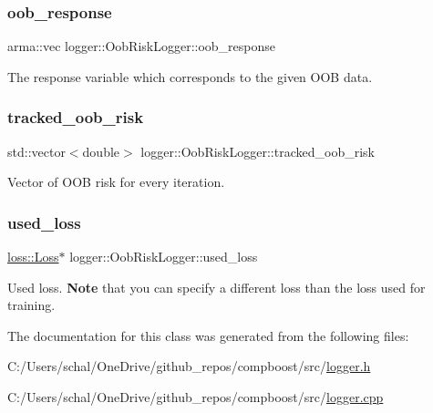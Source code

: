 \subsubsection{\texorpdfstring{oob\+\_\+response}{oob\_response}}
{\footnotesize\ttfamily arma\+::vec logger\+::\+Oob\+Risk\+Logger\+::oob\+\_\+response\hspace{0.3cm}{\ttfamily [private]}}



The response variable which corresponds to the given O\+OB data. 

\mbox{\label{classlogger_1_1_oob_risk_logger_a00a9435107588888c891c88aead67159}} 
\subsubsection{\texorpdfstring{tracked\+\_\+oob\+\_\+risk}{tracked\_oob\_risk}}
{\footnotesize\ttfamily std\+::vector$<$double$>$ logger\+::\+Oob\+Risk\+Logger\+::tracked\+\_\+oob\+\_\+risk\hspace{0.3cm}{\ttfamily [private]}}



Vector of O\+OB risk for every iteration. 

\mbox{\label{classlogger_1_1_oob_risk_logger_a40d02b9eec15e823bb2d71cf2112d6ed}} 
\subsubsection{\texorpdfstring{used\+\_\+loss}{used\_loss}}
{\footnotesize\ttfamily \mbox{\hyperlink{classloss_1_1_loss}{loss\+::\+Loss}}$\ast$ logger\+::\+Oob\+Risk\+Logger\+::used\+\_\+loss\hspace{0.3cm}{\ttfamily [private]}}



Used loss. {\bfseries Note} that you can specify a different loss than the loss used for training. 



The documentation for this class was generated from the following files\+:\begin{DoxyCompactItemize}
\item 
C\+:/\+Users/schal/\+One\+Drive/github\+\_\+repos/compboost/src/\mbox{\hyperlink{logger_8h}{logger.\+h}}\item 
C\+:/\+Users/schal/\+One\+Drive/github\+\_\+repos/compboost/src/\mbox{\hyperlink{logger_8cpp}{logger.\+cpp}}\end{DoxyCompactItemize}
